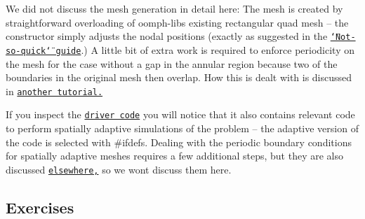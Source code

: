 \begin{DoxyItemize}
\item We did not discuss the mesh generation in detail here\+: The mesh is created by straightforward overloading of {\ttfamily oomph-\/lib\textquotesingle{}s} existing rectangular quad mesh -- the constructor simply adjusts the nodal positions (exactly as suggested in the \href{../../../quick_guide/html/index.html#distorted_mesh}{\tt \char`\"{}\+Not-\/so-\/quick\char`\"{} guide}.) A little bit of extra work is required to enforce periodicity on the mesh for the case without a gap in the annular region because two of the boundaries in the original mesh then overlap. How this is dealt with is discussed in \href{../../../navier_stokes/rayleigh_channel/html/index.html#periodic}{\tt another tutorial.} ~\newline
~\newline

\item If you inspect the \href{../../../../demo_drivers/time_harmonic_linear_elasticity/elastic_annulus/time_harmonic_elastic_annulus.cc}{\tt driver code} you will notice that it also contains relevant code to perform spatially adaptive simulations of the problem -- the adaptive version of the code is selected with {\ttfamily \#ifdefs}. Dealing with the periodic boundary conditions for spatially adaptive meshes requires a few additional steps, but they are also discussed \href{../../../linear_elasticity/refineable_periodic_load/html/index.html#constructor}{\tt elsewhere,} so we won\textquotesingle{}t discuss them here.
\end{DoxyItemize}\hypertarget{index_exercises}{}\subsection{Exercises}\label{index_exercises}

